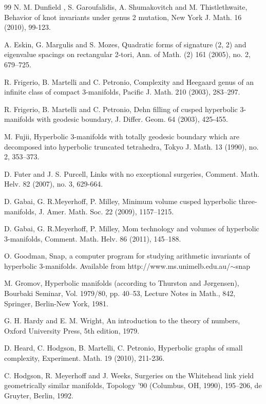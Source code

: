 \documentclass[reqno]{amsproc}  %
\begin{document}
\begin{thebibliography}{99}
 N. M. Dunfield , S. Garoufalidis, A. Shumakovitch and M. Thistlethwaite, 
Behavior of knot invariants under genus 2 mutation, New York J. Math. 16 (2010), 99-123. 

A. Eskin, G. Margulis and  S. Mozes, 
Quadratic forms of signature (2, 2) and eigenvalue spacings on rectangular 2-tori, 
Ann. of Math. (2) 161 (2005), no. 2, 679--725.

 R. Frigerio, B. Martelli and C. Petronio, Complexity and Heegaard genus of an infinite class of compact 3-manifolds, Pacific J. Math. 210 (2003), 283--297.

 R. Frigerio, B. Martelli and C. Petronio, Dehn filling of cusped hyperbolic 3-manifolds with geodesic boundary, J. Differ. Geom. 64 (2003), 425-455.

M. Fujii,  Hyperbolic 3-manifolds with totally geodesic boundary which are decomposed into hyperbolic truncated tetrahedra, Tokyo J. Math. 13 (1990), no. 2, 353--373.

 D. Futer and J. S. Purcell, Links with no exceptional surgeries, Comment. Math. Helv. 82 (2007), no. 3, 629-664.

 D. Gabai, G. R.Meyerhoff,  P. Milley, 
{Minimum volume cusped hyperbolic three-manifolds},
{J. Amer. Math. Soc.} 22 (2009), {1157--1215}.

 D. Gabai, G. R.Meyerhoff,  P. Milley, 
{Mom technology and volumes of hyperbolic 3-manifolds},
{Comment. Math. Helv.} {86} (2011),  {145--188}.

 O. Goodman, Snap, a computer program for studying arithmetic invariants of hyperbolic 3-manifolds. Available from http://www.ms.unimelb.edu.au/$\sim$snap

 M. Gromov, Hyperbolic manifolds (according to Thurston and J{\o}rgensen), 
 Bourbaki Seminar, Vol. 1979/80, pp. 40--53, Lecture Notes in Math., 842, Springer, 
 Berlin-New York, 1981. 

 G. H. Hardy and E. M. Wright, An introduction to the theory of numbers,
Oxford University Press, 5th edition, 1979.

 D. Heard, C. Hodgson, B. Martelli, C. Petronio, Hyperbolic graphs of small complexity, 
Experiment. Math. 19 (2010), 211-236.

 C. Hodgson, R. Meyerhoff and J. Weeks,
Surgeries on the Whitehead link yield geometrically similar manifolds, Topology '90 (Columbus, OH, 1990), 195--206, 
de Gruyter, Berlin, 1992. 


\end{thebibliography}
\end{document}
